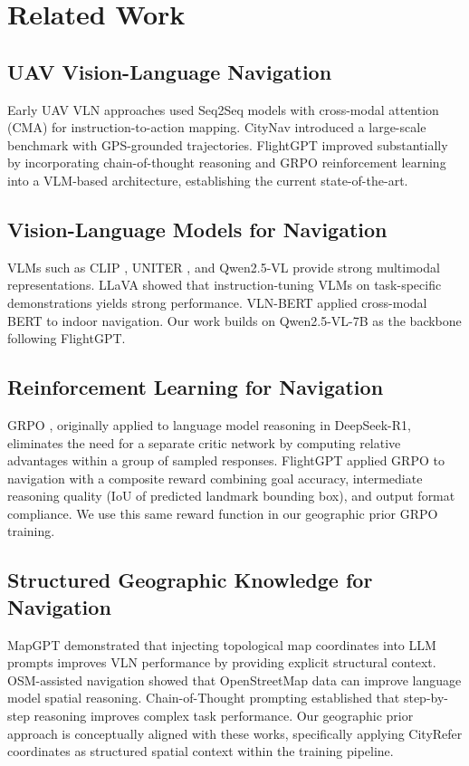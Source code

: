\documentclass[conference]{IEEEtran}
\begin{document}
\section{Related Work}

\subsection{UAV Vision-Language Navigation}
Early UAV VLN approaches used Seq2Seq models \cite{seq2seq} with cross-modal attention (CMA) \cite{aerialvln} for instruction-to-action mapping. CityNav \cite{citynav} introduced a large-scale benchmark with GPS-grounded trajectories. FlightGPT \cite{flightgpt} improved substantially by incorporating chain-of-thought reasoning and GRPO reinforcement learning into a VLM-based architecture, establishing the current state-of-the-art.

\subsection{Vision-Language Models for Navigation}
VLMs such as CLIP \cite{clip}, UNITER \cite{uniter}, and Qwen2.5-VL \cite{qwen25vl} provide strong multimodal representations. LLaVA \cite{llava} showed that instruction-tuning VLMs on task-specific demonstrations yields strong performance. VLN-BERT \cite{vlnbert} applied cross-modal BERT to indoor navigation. Our work builds on Qwen2.5-VL-7B as the backbone following FlightGPT.

\subsection{Reinforcement Learning for Navigation}
GRPO \cite{deepseekr1}, originally applied to language model reasoning in DeepSeek-R1, eliminates the need for a separate critic network by computing relative advantages within a group of sampled responses. FlightGPT applied GRPO to navigation with a composite reward combining goal accuracy, intermediate reasoning quality (IoU of predicted landmark bounding box), and output format compliance. We use this same reward function in our geographic prior GRPO training.

\subsection{Structured Geographic Knowledge for Navigation}
MapGPT \cite{mapgpt} demonstrated that injecting topological map coordinates into LLM prompts improves VLN performance by providing explicit structural context. OSM-assisted navigation \cite{schumann} showed that OpenStreetMap data can improve language model spatial reasoning. Chain-of-Thought prompting \cite{cot} established that step-by-step reasoning improves complex task performance. Our geographic prior approach is conceptually aligned with these works, specifically applying CityRefer coordinates as structured spatial context within the training pipeline.
\end{document}
